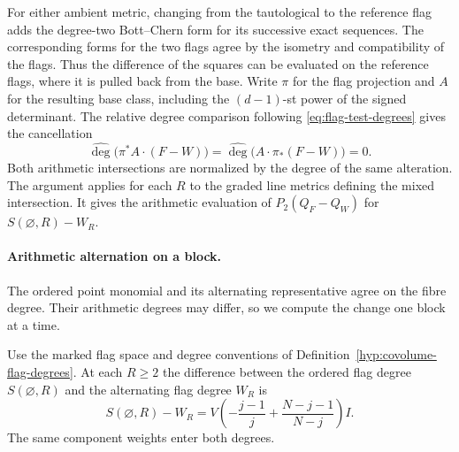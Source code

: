For either ambient metric, changing from the
tautological to the reference flag adds the degree-two
Bott--Chern form for its successive exact sequences.
The corresponding forms for the two flags agree by
the isometry and compatibility of the flags. Thus the
difference of the squares can be evaluated on the
reference flags, where it is pulled back from the base.
Write \(\pi\) for the flag projection and \(A\) for the
resulting base class, including the \((d-1)\)-st power of
the signed determinant. The relative degree comparison
following \eqref{eq:flag-test-degrees} gives the cancellation
\[
 \widehat{\deg}\bigl(\pi^*A\cdot(F-W)\bigr)
 =\widehat{\deg}\bigl(A\cdot\pi_*(F-W)\bigr)=0 .
\]
Both arithmetic intersections are normalized by the degree of the same alteration. The argument applies for each \(R\)
to the graded line metrics defining the mixed intersection. It gives the arithmetic evaluation of
\(P_2(Q_F-Q_W)\) for \(S(\varnothing,R)-W_R\).
\label{cor:covolume-flag-test-3}

\paragraph{Arithmetic alternation on a block.}

The ordered point monomial and its alternating representative agree on the fibre degree. Their arithmetic degrees may differ, so we compute the change one block at a time.

\begin{proposition}
\label{lem:arithmetic-flag-alternation}
Use the marked flag space and degree conventions of
Definition~\ref{hyp:covolume-flag-degrees}. At each \(R\ge2\) the difference between the ordered flag degree \(S(\varnothing,R)\) and the alternating flag degree \(W_R\) is
\[
 S(\varnothing,R)-W_R
 =V\left(-\frac{j-1}{j}+\frac{N-j-1}{N-j}\right)I.
\]
The same component weights enter both degrees.
\end{proposition}

